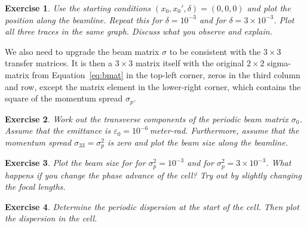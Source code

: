 \documentclass{article}
\newtheorem{exercise}{Exercise}
\newcommand\eps{\varepsilon}
\begin{document}
\begin{exercise}
Use the starting conditions $(x_0,x_0',\delta)=(0,0,0)$ and plot the position along the beamline. Repeat this for $\delta=10^{-3}$ and for $\delta=3\times 10^{-3}$. Plot all three traces in the same graph. Discuss what you observe and explain.
\end{exercise}

We also need to upgrade the beam matrix $\sigma$ to be consistent with the 
$3\times 3$ transfer matrices. It is 
then a $3\times 3$ matrix itself with the original $2\times 2$ sigma-matrix from 
Equation~\ref{eq:bmat} in the top-left corner, zeros in the third column and row,
except the matrix element in the lower-right corner, which contains the square of
the momentum spread $\sigma_p.$ 

\begin{exercise}
Work out the transverse components of the periodic beam
  matrix $\sigma_0$. Assume that the emittance is $\eps_0=10^{-6}$\,meter-rad. 
  Furthermore, assume that the momentum spread $\sigma_{33}=\sigma_p^2$ is zero 
  and plot the beam size along the beamline.
\end{exercise}

\begin{exercise}
Plot the beam size for for $\sigma_p^2=10^{-3}$ and for $\sigma_p^2=3\times 10^{-3}$. What happens if you change the phase advance of the cell? Try out by slightly changing the focal lengths.
\end{exercise}

\begin{exercise}
Determine the periodic dispersion at the start of the cell. Then plot the dispersion in the cell. 
\end{exercise}
\end{document}
